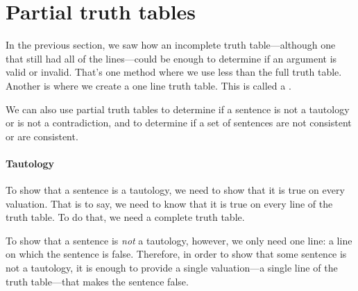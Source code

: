 \section{Partial truth tables }\label{s:PartialTruthTable}

In the previous section, we saw how an incomplete truth table---although one that still had all of the lines---could be enough to determine if an argument is valid or invalid. That's one method where we use less than the full truth table. Another is where we create a one line truth table. This is called a .  

We can also use partial truth tables to determine if a sentence is not a tautology or is not a contradiction, and to determine if a set of sentences are not consistent or are consistent. 

\paragraph{Tautology} 
To show that a sentence is a tautology, we need to show that it is true on every valuation. That is to say, we need to know that it is true on every line of the truth table. To do that, we need a complete truth table. 

To show that a sentence is \emph{not} a tautology, however, we only need one line: a line on which the sentence is false. Therefore, in order to show that some sentence is not a tautology, it is enough to provide a single valuation---a single line of the truth table---that makes the sentence false. 

